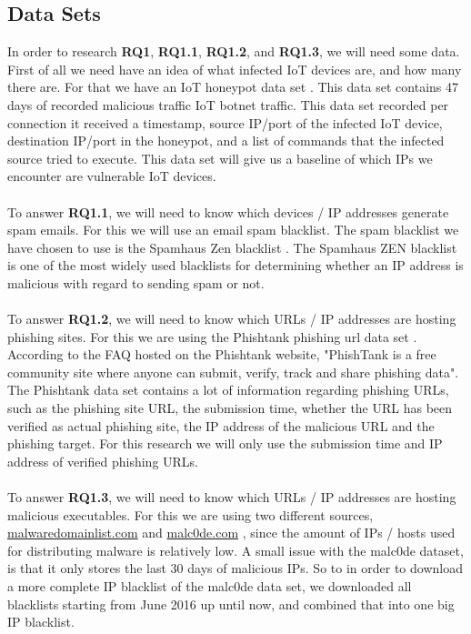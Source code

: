 \documentclass[a4paper,10pt]{article}
\begin{document}
\subsection{Data Sets} \label{sec:methodology:data}
In order to research \textbf{RQ1}, \textbf{RQ1.1}, \textbf{RQ1.2}, and \textbf{RQ1.3}, we will need some data.
First of all we need have an idea of what infected IoT devices are, and how many there are. For that we have
an IoT honeypot data set \cite{iot_honeypot_dataset}. This data set contains 47 days of recorded malicious traffic 
IoT botnet traffic. This data set recorded per connection it received a timestamp, source IP/port of the infected IoT 
device, destination IP/port in the honeypot, and a list of commands that the infected source tried to execute. This 
data set will give us a baseline of which IPs we encounter are vulnerable IoT devices.
\\\\
To answer \textbf{RQ1.1}, we will need to know which devices / IP addresses generate spam emails. For this we
will use an email spam blacklist. The spam blacklist we have chosen to use is the Spamhaus Zen blacklist 
\cite{spamhaus_zen}. The Spamhaus ZEN blacklist is one of the most widely used blacklists for determining whether 
an IP address is malicious with regard to sending spam or not.
\\\\
To answer \textbf{RQ1.2}, we will need to know which URLs / IP addresses are hosting phishing sites. For this we
are using the Phishtank phishing url data set \cite{phishtank}. According to the FAQ hosted on the Phishtank website,
"PhishTank is a free community site where anyone can submit, verify, track and share phishing data". The Phishtank
data set contains a lot of information regarding phishing URLs, such as the phishing site URL, the submission time,
whether the URL has been verified as actual phishing site, the IP address of the malicious URL and the phishing target.
For this research we will only use the submission time and IP address of verified phishing URLs.
\\\\
To answer \textbf{RQ1.3}, we will need to know which URLs / IP addresses are hosting malicious executables. For 
this we are using two different sources, \url{malwaredomainlist.com} \cite{malwaredomainlist} and 
\url{malc0de.com} \cite{malc0de}, since the amount of IPs / hosts used for distributing malware is relatively
low. A small issue with the malc0de dataset, is that it only stores the last 30 days of malicious IPs. So to in order to 
download a more complete IP blacklist of the malc0de data set, we downloaded all blacklists starting from June 2016
up until now, and combined that into one big IP blacklist.
\end{document}
